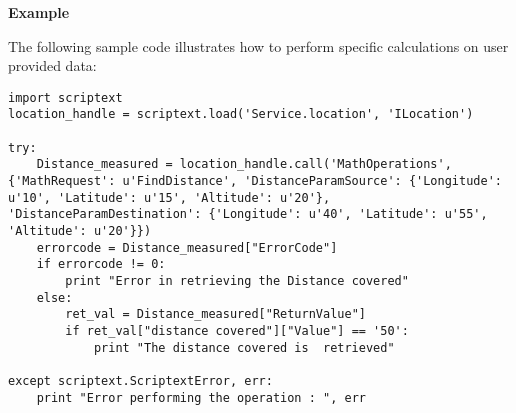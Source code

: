 {\bf Example} \break

The following sample code illustrates how to perform specific calculations on user provided data:

\begin{verbatim}
import scriptext
location_handle = scriptext.load('Service.location', 'ILocation')

try:
    Distance_measured = location_handle.call('MathOperations', {'MathRequest': u'FindDistance', 'DistanceParamSource': {'Longitude': u'10', 'Latitude': u'15', 'Altitude': u'20'}, 'DistanceParamDestination': {'Longitude': u'40', 'Latitude': u'55', 'Altitude': u'20'}})
    errorcode = Distance_measured["ErrorCode"]
    if errorcode != 0:
        print "Error in retrieving the Distance covered"
    else:
        ret_val = Distance_measured["ReturnValue"]
        if ret_val["distance covered"]["Value"] == '50':
            print "The distance covered is  retrieved"

except scriptext.ScriptextError, err:
    print "Error performing the operation : ", err
\end{verbatim}
\pagebreak

